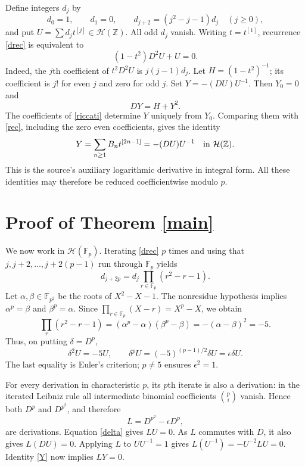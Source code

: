 \documentclass[11pt]{article}
\begin{document}
Define integers $d_j$ by
\begin{equation}\label{drec}
d_0=1,\qquad d_1=0,\qquad
d_{j+2}=(j^2-j-1)d_j\quad(j\ge0),
\end{equation}
and put $U=\sum d_jt^{[j]}\in\mathcal H(\mathbb Z)$. All odd $d_j$ vanish.
Writing $t=t^{[1]}$, recurrence \eqref{drec} is equivalent to
\[
(1-t^2)D^2U+U=0.
\]
Indeed, the $j$th coefficient of $t^2D^2U$ is $j(j-1)d_j$.
Let $H=(1-t^2)^{-1}$; its coefficient is $j!$ for even $j$ and zero
for odd $j$. Set $Y=-(DU)U^{-1}$. Then $Y_0=0$ and
\begin{equation}\label{riccati}
DY=H+Y^2.
\end{equation}
The coefficients of \eqref{riccati} determine $Y$ uniquely from $Y_0$.
Comparing them with \eqref{rec}, including the zero even coefficients,
gives the identity
\begin{equation}\label{Y}
Y=\sum_{n\ge1}B_nt^{[2n-1]}=-(DU)U^{-1}
\quad\hbox{in }\mathcal H(\mathbb Z).
\end{equation}
This is the source's auxiliary logarithmic derivative in integral form.
All these identities may therefore be reduced coefficientwise modulo $p$.

\section*{Proof of Theorem \ref{main}}
We now work in $\mathcal H(\mathbb F_p)$. Iterating \eqref{drec} $p$ times
and using that $j,j+2,\ldots,j+2(p-1)$ run through $\mathbb F_p$ yields
\[
d_{j+2p}=d_j\prod_{r\in\mathbb F_p}(r^2-r-1).
\]
Let $\alpha,\beta\in\mathbb F_{p^2}$ be the roots of $X^2-X-1$.
The nonresidue hypothesis implies $\alpha^p=\beta$ and $\beta^p=\alpha$.
Since $\prod_{r\in\mathbb F_p}(X-r)=X^p-X$, we obtain
\[
\prod_r(r^2-r-1)
=(\alpha^p-\alpha)(\beta^p-\beta)
=-(\alpha-\beta)^2=-5.
\]
Thus, on putting $\delta=D^p$,
\begin{equation}\label{delta}
\delta^2U=-5U,\qquad
\delta^pU=(-5)^{(p-1)/2}\delta U=\epsilon\delta U.
\end{equation}
The last equality is Euler's criterion; $p\ne5$ ensures
$\epsilon^2=1$.

For every derivation in characteristic $p$, its $p$th iterate is also
a derivation: in the iterated Leibniz rule all intermediate binomial
coefficients $\binom pi$ vanish. Hence both $D^p$ and $D^{p^2}$, and
therefore
\[
L=D^{p^2}-\epsilon D^p,
\]
are derivations. Equation \eqref{delta} gives $LU=0$. As $L$ commutes
with $D$, it also gives $L(DU)=0$. Applying $L$ to $UU^{-1}=1$ gives
$L(U^{-1})=-U^{-2}LU=0$. Identity \eqref{Y} now implies $LY=0$.
\end{document}
